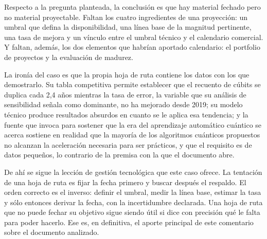 \documentclass[11pt,letterpaper]{article}
\begin{document}
Respecto a la pregunta planteada, la conclusión es que hay material fechado
pero no material proyectable. Faltan los cuatro ingredientes de una proyección:
un umbral que defina la disponibilidad, una línea base de la magnitud
pertinente, una tasa de mejora y un vínculo entre el umbral técnico y el
calendario comercial. Y faltan, además, los dos elementos que habrían aportado
calendario: el portfolio de proyectos y la evaluación de madurez.

La ironía del caso es que la propia hoja de ruta contiene los datos con los que
demostrarlo. Su tabla competitiva permite establecer que el recuento de cúbits
se duplica cada 2,4 años mientras la tasa de error, la variable que su análisis
de sensibilidad señala como dominante, no ha mejorado desde 2019; su modelo
técnico produce resultados absurdos en cuanto se le aplica esa tendencia; y la
fuente que invoca para sostener que la era del aprendizaje automático cuántico
se acerca sostiene en realidad que la mayoría de los algoritmos cuánticos
propuestos no alcanzan la aceleración necesaria para ser prácticos, y que el
requisito es de datos pequeños, lo contrario de la premisa con la que el
documento abre.

De ahí se sigue la lección de gestión tecnológica que este caso ofrece. La
tentación de una hoja de ruta es fijar la fecha primero y buscar después el
respaldo. El orden correcto es el inverso: definir el umbral, medir la línea
base, estimar la tasa y sólo entonces derivar la fecha, con la incertidumbre
declarada. Una hoja de ruta que no puede fechar su objetivo sigue siendo útil
si dice con precisión qué le falta para poder hacerlo. Ese es, en definitiva,
el aporte principal de este comentario sobre el documento analizado.

\printbibliography[title={Referencias bibliográficas}]
\end{document}
